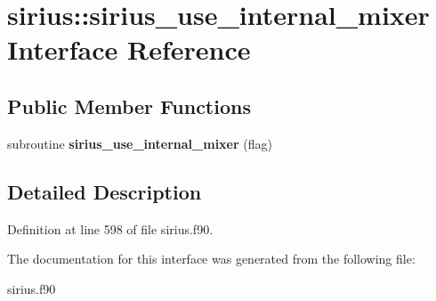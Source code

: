 \hypertarget{interfacesirius_1_1sirius__use__internal__mixer}{}\section{sirius\+:\+:sirius\+\_\+use\+\_\+internal\+\_\+mixer Interface Reference}
\label{interfacesirius_1_1sirius__use__internal__mixer}
\subsection*{Public Member Functions}
\begin{DoxyCompactItemize}
\item 
\hypertarget{interfacesirius_1_1sirius__use__internal__mixer_a81249a082ba44d9f308d7449ca2913a7}{}subroutine {\bfseries sirius\+\_\+use\+\_\+internal\+\_\+mixer} (flag)\label{interfacesirius_1_1sirius__use__internal__mixer_a81249a082ba44d9f308d7449ca2913a7}

\end{DoxyCompactItemize}


\subsection{Detailed Description}


Definition at line 598 of file sirius.\+f90.



The documentation for this interface was generated from the following file\+:\begin{DoxyCompactItemize}
\item 
sirius.\+f90\end{DoxyCompactItemize}
